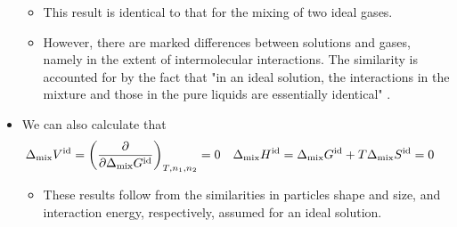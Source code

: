 \documentclass[../notes.tex]{subfiles}
\begin{document}
\begin{itemize}
\begin{itemize}
        \item This result is identical to that for the mixing of two ideal gases.
        \item However, there are marked differences between solutions and gases, namely in the extent of intermolecular interactions. The similarity is accounted for by the fact that "in an ideal solution, the interactions in the mixture and those in the pure liquids are essentially identical" \parencite[977]{bib:McQuarrieSimon}.
    \end{itemize}
    \item We can also calculate that
    \begin{align*}
        \Delta_\text{mix}V^\text{id} &= \left( \pdv{\Delta_\text{mix}G^\text{id}} \right)_{T,n_1,n_2} = 0&
        \Delta_\text{mix}H^\text{id} &= \Delta_\text{mix}G^\text{id}+T\Delta_\text{mix}S^\text{id} = 0
    \end{align*}
    \begin{itemize}
        \item These results follow from the similarities in particles shape and size, and interaction energy, respectively, assumed for an ideal solution.
    \end{itemize}
\end{itemize}
\end{document}
